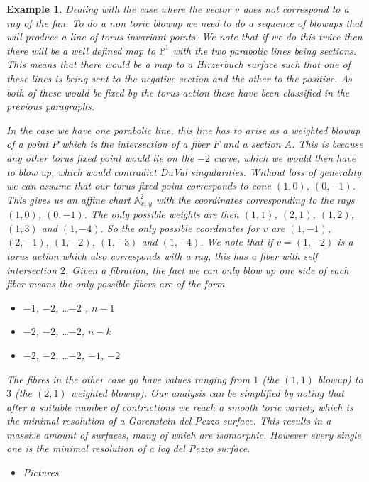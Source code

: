 \documentclass[11pt]{amsart}
\theoremstyle{plain}
\newtheorem{ex}[thm]{Example}
\newcommand{\mb}[1]{\mathbb{#1}}
\begin{document}
\begin{ex}
Dealing with the case where the vector $v$ does not correspond to a ray of the fan. To do a non toric blowup we need to do a  sequence of blowups that will produce a line of torus invariant points. We note that if we do this twice then there will be a well defined map to $\mb{P}^1$ with the two parabolic lines being sections. This means that there would be a map to a Hirzerbuch surface such that one of these lines is being sent to the negative section and the other to the positive. As both of these would be fixed by the torus action these have been classified in the previous paragraphs.


In the case we have one parabolic line, this line has to arise as a weighted blowup of a point $P$ which is the intersection of a fiber $F$ and a section $A$. This is because any other torus fixed point would lie on the $-2$ curve, which we would then have to blow up, which would contradict DuVal singularities. Without loss of generality we can assume that our torus fixed point corresponds to cone $(1,0)$, $(0, -1)$. This gives us an affine chart $\mb{A}^2_{x, \, y}$ with the coordinates corresponding to the rays $(1,0)$, $(0, -1)$. The only possible weights are then $(1,1)$, $(2,1)$, $(1,2)$, $(1,3)$ and $(1,-4)$. So the only possible coordinates for $v$ are $(1, -1)$, $(2, -1)$, $(1, -2)$, $(1, -3)$ and $(1,-4)$. We note that if $v = (1,-2)$ is a torus action which also corresponds with a ray, this has a fiber with self intersection $2$. Given a fibration, the fact we can only blow up one side of each fiber means the only possible fibers are of the form 

\begin{itemize}
\item $-1$, $-2$, \dots $-2$ , $n-1$
\item $-2$, $-2$, \dots $-2$, $n-k$
\item $-2$, $-2$, \dots $-2$, $-1$, $-2$

\end{itemize}

The fibres in the other case go have values ranging from $1$ (the $(1,1)$ blowup) to $3$ (the $(2,1)$ weighted blowup). Our analysis can be simplified by noting that after a suitable number of contractions we reach a smooth toric variety which is the minimal resolution of a Gorenstein del Pezzo surface. This results in a massive amount of surfaces, many of which are isomorphic.
However every single one is the minimal resolution of a log del Pezzo surface.

\begin{itemize}
\item Pictures
\end{itemize}

\end{ex}
\end{document}
